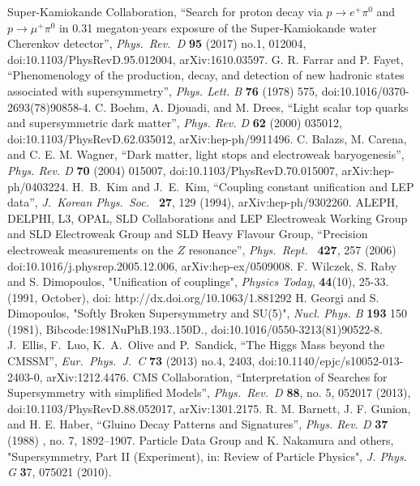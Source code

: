 \begin{thebibliography}{9}
Super-Kamiokande Collaboration,
``Search for proton decay via $p \to e^+\pi^0$ and $p \to \mu^+\pi^0$ in 0.31 megaton$\cdot$years exposure of the Super-Kamiokande water Cherenkov detector'',
{\it Phys.\ Rev.\ D} {\bf 95} (2017) no.1,  012004, doi:10.1103/PhysRevD.95.012004,
arXiv:1610.03597.
G. R. Farrar and P. Fayet, “Phenomenology of the production, decay, and detection of new hadronic states associated with supersymmetry”, {\it Phys. Lett. B} {\bf 76} (1978) 575, doi:10.1016/0370-2693(78)90858-4.
C. Boehm, A. Djouadi, and M. Drees, “Light scalar top quarks and supersymmetric dark matter”, {\it Phys. Rev. D} {\bf 62} (2000) 035012, doi:10.1103/PhysRevD.62.035012, arXiv:hep-ph/9911496.
C. Balazs, M. Carena, and C. E. M. Wagner, “Dark matter, light stops and electroweak baryogenesis”, {\it Phys. Rev. D} {\bf 70} (2004) 015007, doi:10.1103/PhysRevD.70.015007, arXiv:hep-ph/0403224.
  H.~B.~Kim and J.~E.~Kim,
  ``Coupling constant unification and LEP data'',
  {\it J.\ Korean Phys.\ Soc.\ }  {\bf 27}, 129 (1994), arXiv:hep-ph/9302260. 
  ALEPH, DELPHI, L3, OPAL, SLD Collaborations and LEP Electroweak Working Group and SLD Electroweak Group and SLD Heavy Flavour Group,
  ``Precision electroweak measurements on the $Z$ resonance'',
  {\it Phys.\ Rept.\ } {\bf 427}, 257 (2006)
  doi:10.1016/j.physrep.2005.12.006,
  arXiv:hep-ex/0509008.
F. Wilczek, S. Raby and S. Dimopoulos, 
"Unification of couplings", {\it Physics Today}, {\bf 44}(10), 25-33. (1991, October),
doi: http://dx.doi.org/10.1063/1.881292
H. Georgi and S. Dimopoulos, "Softly Broken Supersymmetry and SU(5)", {\it Nucl. Phys. B} {\bf 193} 150 (1981), Bibcode:1981NuPhB.193..150D.,
doi:10.1016/0550-3213(81)90522-8.
  J.~Ellis, F.~Luo, K.~A.~Olive and P.~Sandick,
  ``The Higgs Mass beyond the CMSSM'',
  {\it Eur.\ Phys.\ J.\ C} {\bf 73} (2013) no.4,  2403, doi:10.1140/epjc/s10052-013-2403-0,
  arXiv:1212.4476.
 CMS Collaboration, ``Interpretation of Searches for Supersymmetry with simplified Models'',
  {\it Phys.\ Rev.\ D} {\bf 88}, no. 5, 052017 (2013), doi:10.1103/PhysRevD.88.052017,
  arXiv:1301.2175.
R. M. Barnett, J. F. Gunion, and H. E. Haber, “Gluino Decay Patterns and Signatures”, {\it Phys. Rev. D } \textbf{37} (1988) , no. 7, 1892–1907.
{Particle Data Group} and K. Nakamura and others, "Supersymmetry, Part II (Experiment), in: Review of Particle Physics", {\it J. Phys. G} {\textbf 37}, 075021 (2010).

\end{thebibliography}

